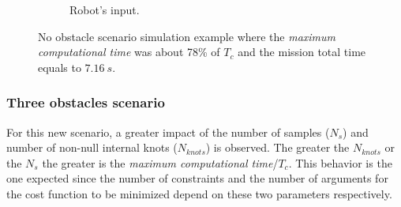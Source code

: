 \begin{figure}[!h]
\begin{subfigure}[b]{0.48\textwidth}
                \caption{Robot's input.}\label{fig:sim0rinput}
        \end{subfigure}
        \caption{No obstacle scenario simulation example where the \textit{maximum computational time} was about 78\% of $T_c$ and the mission total time equals to $7.16\ s$.}\label{fig:sim0}
\end{figure}

\subsubsection{Three obstacles scenario}

For this new scenario, a greater impact of the number of samples ($N_s$) and number of non-null internal knots ($N_{knots}$) is observed. The greater the $N_{knots}$ or the $N_s$ the greater is the \textit{maximum computational time}/$T_c$. This behavior is the one expected since the number of constraints and the number of arguments for the cost function to be minimized depend on these two parameters respectively.

